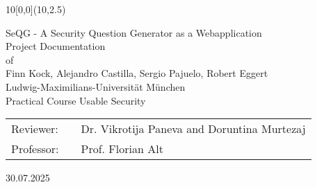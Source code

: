\documentclass{thesisclass}
\newcommand{\type}{Project Documentation}
\newcommand{\group}{Finn Kock, Alejandro Castilla, Sergio Pajuelo, Robert Eggert}
\newcommand{\mytitle}{SeQG - A Security Question Generator as a Webapplication}
\newcommand{\course}{Practical Course Usable Security}
\newcommand{\reviewerone}{Dr. Vikrotija Paneva and Doruntina Murtezaj}
\newcommand{\prof}{Prof. Florian Alt}
\newcommand{\timeend}{30.07.2025}
\begin{document}
\begin{titlepage}
	\begin{textblock}{10}[0,0](10,2.5)
	\end{textblock}
	\vspace*{3cm}
	\begin{center}
		\Huge{\mytitle}
		\vspace*{1.6cm}\\ %
		\Large{
			\type\\of
		}\\
		\vspace*{1cm}
		\huge{\group}\\
		\vspace*{1cm} %
		\Large{
			{Ludwig-Maximilians-Universität München}
			\\
			\course
		}
	\end{center}
	\vspace*{1.8cm} %
	\Large{
		\begin{center}
			\begin{tabular}[ht]{l c l}

				Reviewer: & \hfill  & \reviewerone\\
                Professor: & \hfill & \prof
			
			\end{tabular}
		\end{center}
	}
	
	
	\vspace{1.8cm} %
	\begin{center}
		\timeend
	 \end{center}
	
	
	
\end{titlepage}
\clearpage



\end{document}
